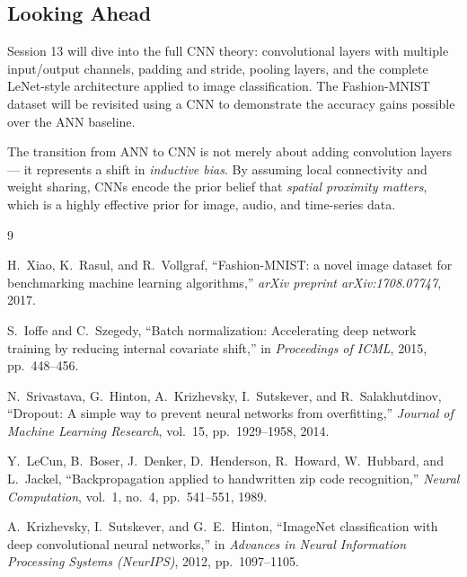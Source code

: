 \documentclass[12pt,a4paper]{article}
\begin{document}
\subsection{Looking Ahead}
\label{sec:summary:ahead}

Session 13 will dive into the full CNN theory: convolutional layers with
multiple input/output channels, padding and stride, pooling layers, and the
complete LeNet-style architecture applied to image classification.  The
Fashion-MNIST dataset will be revisited using a CNN to demonstrate the
accuracy gains possible over the ANN baseline.

\begin{keyinsight}
  The transition from ANN to CNN is not merely about adding convolution layers
  --- it represents a shift in \emph{inductive bias}.  By assuming local
  connectivity and weight sharing, CNNs encode the prior belief that
  \emph{spatial proximity matters}, which is a highly effective prior for
  image, audio, and time-series data.
\end{keyinsight}

\begin{thebibliography}{9}

H.\ Xiao, K.\ Rasul, and R.\ Vollgraf,
``Fashion-MNIST: a novel image dataset for benchmarking machine learning
  algorithms,''
\textit{arXiv preprint arXiv:1708.07747}, 2017.

S.\ Ioffe and C.\ Szegedy,
``Batch normalization: Accelerating deep network training by reducing
  internal covariate shift,''
in \textit{Proceedings of ICML}, 2015, pp.\ 448--456.

N.\ Srivastava, G.\ Hinton, A.\ Krizhevsky, I.\ Sutskever, and R.\ Salakhutdinov,
``Dropout: A simple way to prevent neural networks from overfitting,''
\textit{Journal of Machine Learning Research}, vol.\ 15, pp.\ 1929--1958, 2014.

Y.\ LeCun, B.\ Boser, J.\ Denker, D.\ Henderson, R.\ Howard, W.\ Hubbard,
and L.\ Jackel,
``Backpropagation applied to handwritten zip code recognition,''
\textit{Neural Computation}, vol.\ 1, no.\ 4, pp.\ 541--551, 1989.

A.\ Krizhevsky, I.\ Sutskever, and G.\ E.\ Hinton,
``ImageNet classification with deep convolutional neural networks,''
in \textit{Advances in Neural Information Processing Systems (NeurIPS)},
2012, pp.\ 1097--1105.

\end{thebibliography}
\end{document}

